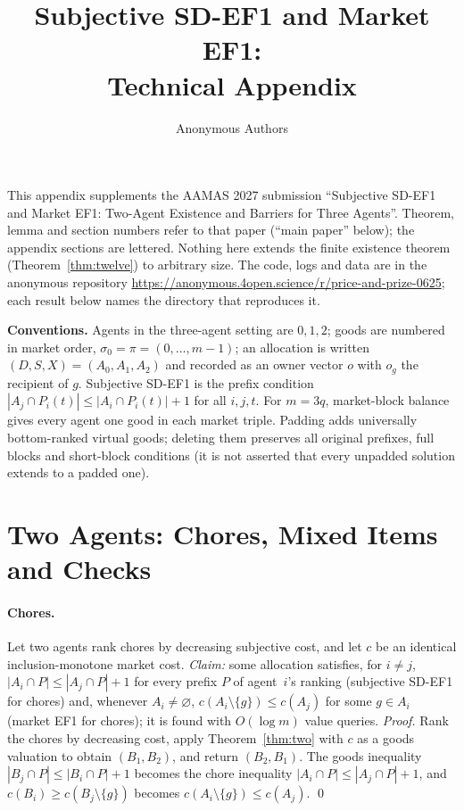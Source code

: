 \documentclass[11pt]{article}
\title{Subjective SD-EF1 and Market EF1:\\Technical Appendix}
\author{Anonymous Authors}
\date{}
\theoremstyle{definition}
\begin{document}
\maketitle

\noindent This appendix supplements the AAMAS 2027 submission ``Subjective SD-EF1 and Market EF1: Two-Agent Existence and Barriers for Three Agents''. Theorem, lemma and section numbers refer to that paper (``main paper'' below); the appendix sections are lettered. Nothing here extends the finite existence theorem (Theorem~\ref{thm:twelve}) to arbitrary size. The code, logs and data are in the anonymous repository \url{https://anonymous.4open.science/r/price-and-prize-0625}; each result below names the directory that reproduces it.

\medskip\noindent\textbf{Conventions.} Agents in the three-agent setting are $0,1,2$; goods are numbered in market order, $\sigma_0=\pi=(0,\dots,m-1)$; an allocation is written $(D,S,X)=(A_0,A_1,A_2)$ and recorded as an owner vector $o$ with $o_g$ the recipient of $g$. Subjective SD-EF1 is the prefix condition $|A_j\cap P_i(t)|\le|A_i\cap P_i(t)|+1$ for all $i,j,t$. For $m=3q$, market-block balance gives every agent one good in each market triple. Padding adds universally bottom-ranked virtual goods; deleting them preserves all original prefixes, full blocks and short-block conditions (it is not asserted that every unpadded solution extends to a padded one).

\tableofcontents

\section{Two Agents: Chores, Mixed Items and Checks}\label{app:two}
\paragraph{Chores.}
Let two agents rank chores by decreasing subjective cost, and let $c$ be an identical inclusion-monotone market cost. \emph{Claim:} some allocation satisfies, for $i\ne j$, $|A_i\cap P|\le|A_j\cap P|+1$ for every prefix $P$ of agent~$i$'s ranking (subjective SD-EF1 for chores) and, whenever $A_i\ne\varnothing$, $c(A_i\setminus\{g\})\le c(A_j)$ for some $g\in A_i$ (market EF1 for chores); it is found with $O(\log m)$ value queries. \emph{Proof.} Rank the chores by decreasing cost, apply Theorem~\ref{thm:two} with $c$ as a goods valuation to obtain $(B_1,B_2)$, and return $(B_2,B_1)$. The goods inequality $|B_j\cap P|\le|B_i\cap P|+1$ becomes the chore inequality $|A_i\cap P|\le|A_j\cap P|+1$, and $c(B_i)\ge c(B_j\setminus\{g\})$ becomes $c(A_i\setminus\{g\})\le c(A_j)$. \qed
\end{document}
